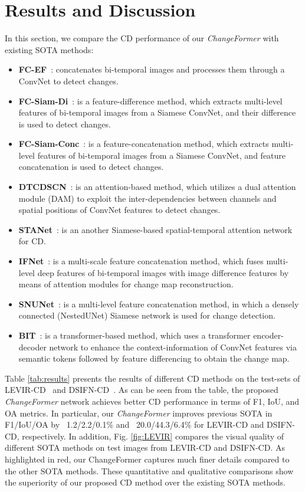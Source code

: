 \documentclass{article}
\begin{document}
\section{Results and Discussion}
\label{sec:results}
In this section, we compare the CD performance of our \textit{ChangeFormer} with existing SOTA methods:
\begin{itemize}[noitemsep]
    \itemsep0em
    \item \textbf{FC-EF}~\cite{CD_FC}: concatenates bi-temporal images and processes them through a ConvNet to detect changes. 
    \item \textbf{FC-Siam-Di}~\cite{CD_FC}: is a feature-difference method, which extracts multi-level features of bi-temporal images from a Siamese ConvNet, and  their difference is used to detect changes. 
    \item \textbf{FC-Siam-Conc}~\cite{CD_FC}: is a feature-concatenation method, which extracts multi-level features of bi-temporal images from a Siamese ConvNet, and feature concatenation is used to detect changes. 
    \item \textbf{DTCDSCN}~\cite{CD_DTCDSCN}: is an attention-based method, which utilizes a dual attention module (DAM) to exploit the inter-dependencies between channels and spatial positions of ConvNet features to detect changes. 
    \item \textbf{STANet}~\cite{CD_STANet}: is an another Siamese-based spatial-temporal attention network for CD.
    \item \textbf{IFNet}~\cite{CD_IFNet}: is a multi-scale feature concatenation method, which fuses multi-level deep features of bi-temporal images with image difference features by means of attention modules for change map reconstruction.
    \item \textbf{SNUNet}~\cite{CD_SNUNet}: is a multi-level feature concatenation method, in which a densely connected (NestedUNet) Siamese network is used for change detection.
    \item \textbf{BIT}~\cite{transformer_cd}: is a transformer-based method, which uses a transformer encoder-decoder network to enhance the context-information of ConvNet features via semantic tokens followed by feature differencing to obtain the change map. 
\end{itemize}

\par Table \ref{tab:results} presents the results of different CD methods on the test-sets of LEVIR-CD~\cite{LEVIR} and DSIFN-CD~\cite{DSIFN}. As can be seen from the table, the proposed \textit{ChangeFormer} network achieves better CD performance in terms of F1, IoU, and OA metrics. In particular, our \textit{ChangeFormer} improves previous SOTA in F1/IoU/OA by ~1.2/2.2/0.1\% and ~20.0/44.3/6.4\% for LEVIR-CD and DSIFN-CD, respectively. In addition, Fig. \ref{fig:LEVIR} compares the visual quality of different SOTA methods on test images from LEVIR-CD and DSIFN-CD. As highlighted in red, our ChangeFormer captures much finer details compared to the other SOTA methods. These quantitative and qualitative comparisons show the superiority of our proposed CD method over the existing SOTA methods.
\end{document}
